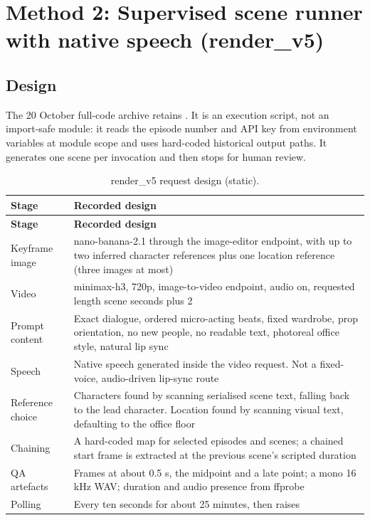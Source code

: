 \documentclass[11pt,a4paper]{article}
\newcommand{\code}[1]{\texttt{\detokenize{#1}}}
\begin{document}
\section{Method 2: Supervised scene runner with native speech (render\_v5)}
\subsection{Design}
The 20 October full-code archive retains \code{render_v5/render_step.py}. It is an execution script, not an import-safe module: it reads the episode number and API key from environment variables at module scope and uses hard-coded historical output paths. It generates one scene per invocation and then stops for human review.
\begin{longtable}{@{}P{4.2cm}P{11.3cm}@{}}
\caption{render\_v5 request design (static).}\\
\toprule \textbf{Stage} & \textbf{Recorded design}\\ \midrule\endfirsthead
\toprule \textbf{Stage} & \textbf{Recorded design}\\ \midrule\endhead
Keyframe image & nano-banana-2.1 through the image-editor endpoint, with up to two inferred character references plus one location reference (three images at most)\\
Video & minimax-h3, 720p, image-to-video endpoint, audio on, requested length scene seconds plus 2\\
Prompt content & Exact dialogue, ordered micro-acting beats, fixed wardrobe, prop orientation, no new people, no readable text, photoreal office style, natural lip sync\\
Speech & Native speech generated inside the video request. Not a fixed-voice, audio-driven lip-sync route\\
Reference choice & Characters found by scanning serialised scene text, falling back to the lead character. Location found by scanning visual text, defaulting to the office floor\\
Chaining & A hard-coded map for selected episodes and scenes; a chained start frame is extracted at the previous scene's scripted duration\\
QA artefacts & Frames at about 0.5 s, the midpoint and a late point; a mono 16 kHz WAV; duration and audio presence from ffprobe\\
Polling & Every ten seconds for about 25 minutes, then raises\\
\bottomrule
\end{longtable}
\end{document}
